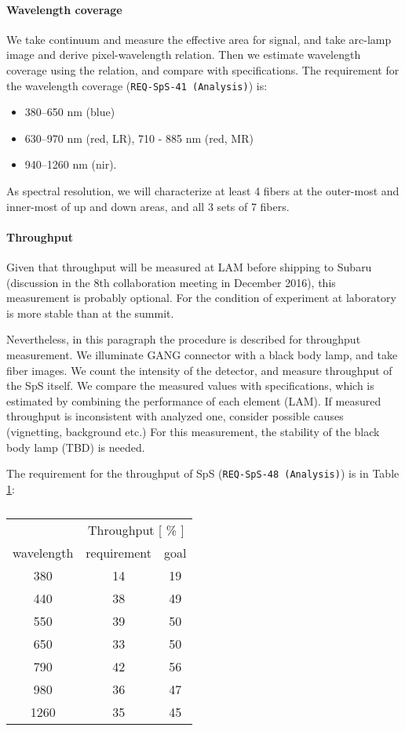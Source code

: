 \paragraph{Wavelength coverage}
We take continuum and measure the effective area for signal, and take arc-lamp image and derive pixel-wavelength relation.
Then we estimate wavelength coverage using the relation, and compare with specifications.
The requirement for the wavelength coverage ({\tt REQ-SpS-41 (Analysis)}) is:
\begin{itemize}
\item 380--650 nm (blue)
\item 630--970 nm (red, LR), 710 - 885 nm (red, MR)
\item 940--1260 nm (nir).
\end{itemize}
As spectral resolution, we will characterize at least 4 fibers at the outer-most and inner-most of up and down areas, and all 3 sets of 7 fibers.

\paragraph{Throughput}
Given that throughput will be measured at LAM before shipping to Subaru (discussion in the 8th collaboration meeting in December 2016), this measurement is probably optional.
For the condition of experiment at laboratory is more stable than at the summit.

Nevertheless, in this paragraph the procedure is described for throughput measurement.
We illuminate GANG connector with a black body lamp, and take fiber images.
We count the intensity of the detector, and measure throughput of the SpS itself.
We compare the measured values with specifications, which is estimated by combining the performance of each element (LAM).
If measured throughput is inconsistent with analyzed one, consider possible causes (vignetting, background etc.) 
For this measurement, the stability of the black body lamp (TBD) is needed.

The requirement for the throughput of SpS ({\tt REQ-SpS-48 (Analysis)}) is in Table \ref{tab:SpSthroughput}:
\begin{table}[!ht]
\begin{center}
\caption{}
\label{tab:SpSthroughput}
\begin{tabular}{c|cc}  \hline
 & \multicolumn{2}{c}{Throughput [ \% ]} \\
wavelength &  requirement & goal \\ \hline \hline
380 & 14 & 19 \\
440 & 38 & 49 \\
550 & 39 & 50 \\
650 & 33 & 50 \\
790 & 42 & 56 \\
980 & 36 & 47 \\
1260 & 35 & 45 \\  \hline
\end{tabular}
\end{center}
\end{table}

